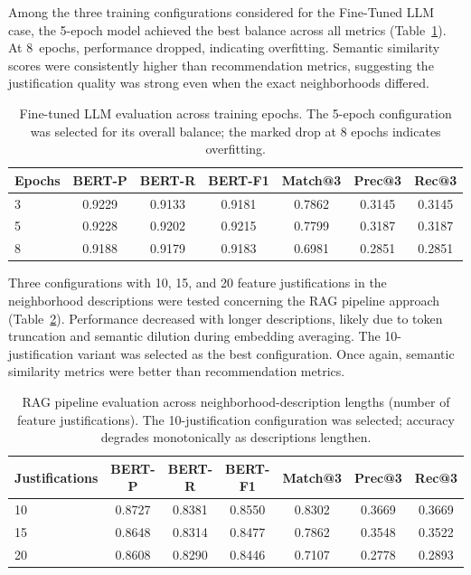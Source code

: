 \documentclass[pdflatex,sn-mathphys-num]{sn-jnl}%
\theoremstyle{thmstyleone}%
\theoremstyle{thmstyletwo}%
\theoremstyle{thmstylethree}%
\begin{document}
Among the three training configurations considered for the Fine-Tuned LLM case, the 5-epoch model achieved the best balance across all metrics (Table~\ref{tab:ablation_ft}). At 8~epochs, performance dropped, indicating overfitting. Semantic similarity scores were consistently higher than recommendation metrics, suggesting the justification quality was strong even when the exact neighborhoods differed.

\begin{table}[htbp]
    \centering
    \begin{tabular}{lcccccc}
    \toprule
    \textbf{Epochs} & \textbf{BERT-P} & \textbf{BERT-R} & \textbf{BERT-F1} & \textbf{Match@3} & \textbf{Prec@3} & \textbf{Rec@3} \\
    \midrule
    3 & 0.9229 & 0.9133 & 0.9181 & 0.7862 & 0.3145 & 0.3145 \\
    5 & 0.9228 & 0.9202 & 0.9215 & 0.7799 & 0.3187 & 0.3187 \\
    8 & 0.9188 & 0.9179 & 0.9183 & 0.6981 & 0.2851 & 0.2851 \\
    \bottomrule
    \end{tabular}
    \caption{Fine-tuned LLM evaluation across training epochs. The 5-epoch configuration was selected for its overall balance; the marked drop at 8 epochs indicates overfitting.}
    \label{tab:ablation_ft}
\end{table}


Three configurations with 10, 15, and 20 feature justifications in the neighborhood descriptions were tested concerning the RAG pipeline approach (Table~\ref{tab:ablation_rag}). Performance decreased with longer descriptions, likely due to token truncation and semantic dilution during embedding averaging. The 10-justification variant was selected as the best configuration. Once again, semantic similarity metrics were better than recommendation metrics.

\begin{table}[htbp]
    \centering
    \begin{tabular}{lcccccc}
    \toprule
    \textbf{Justifications} & \textbf{BERT-P} & \textbf{BERT-R} & \textbf{BERT-F1} & \textbf{Match@3} & \textbf{Prec@3} & \textbf{Rec@3} \\
    \midrule
    10 & 0.8727 & 0.8381 & 0.8550 & 0.8302 & 0.3669 & 0.3669 \\
    15 & 0.8648 & 0.8314 & 0.8477 & 0.7862 & 0.3548 & 0.3522 \\
    20 & 0.8608 & 0.8290 & 0.8446 & 0.7107 & 0.2778 & 0.2893 \\
    \bottomrule
    \end{tabular}
    \caption{RAG pipeline evaluation across neighborhood-description lengths (number of feature justifications). The 10-justification configuration was selected; accuracy degrades monotonically as descriptions lengthen.}
    \label{tab:ablation_rag}
\end{table}
\end{document}
